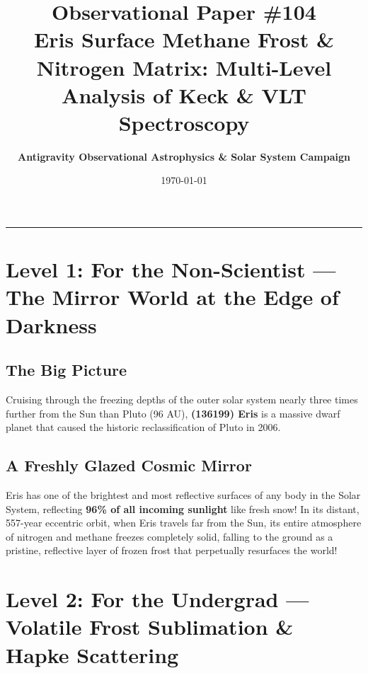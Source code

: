 \documentclass[11pt,a4paper]{article}
\title{\Huge \textbf{Observational Paper \#104}\\ \Large Eris Surface Methane Frost \& Nitrogen Matrix: Multi-Level Analysis of Keck \& VLT Spectroscopy}
\author{\textbf{Antigravity Observational Astrophysics \& Solar System Campaign}}
\date{\today}
\begin{document}
\maketitle

\vspace{-1em}
\begin{center}
\rule{\textwidth}{1.5pt}
\end{center}

\section*{Level 1: For the Non-Scientist — The Mirror World at the Edge of Darkness}

\subsection*{The Big Picture}
Cruising through the freezing depths of the outer solar system nearly three times further from the Sun than Pluto (96 AU), \textbf{(136199) Eris} is a massive dwarf planet that caused the historic reclassification of Pluto in 2006.

\subsection*{A Freshly Glazed Cosmic Mirror}
Eris has one of the brightest and most reflective surfaces of any body in the Solar System, reflecting \textbf{96\% of all incoming sunlight} like fresh snow! In its distant, 557-year eccentric orbit, when Eris travels far from the Sun, its entire atmosphere of nitrogen and methane freezes completely solid, falling to the ground as a pristine, reflective layer of frozen frost that perpetually resurfaces the world!

\newpage

\section*{Level 2: For the Undergrad — Volatile Frost Sublimation \& Hapke Scattering}
\end{document}
